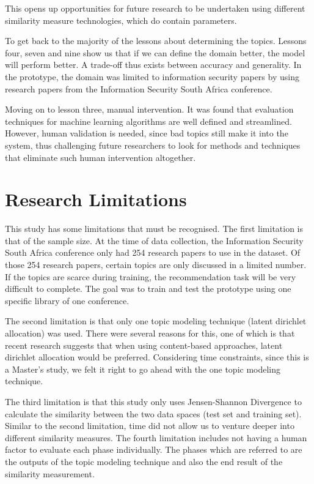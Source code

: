 This opens up opportunities for future research to be undertaken using different similarity measure technologies, which do contain parameters. 

To get back to the majority of the lessons about determining the topics. Lessons four, seven and nine show us that if we can define the domain better, the model will perform better. A trade-off thus exists between accuracy and generality. In the prototype, the domain was limited to information security papers by using research papers from the Information Security South Africa conference. 

Moving on to lesson three, manual intervention. It was found that evaluation techniques for machine learning algorithms are well defined and streamlined. However, human validation is needed, since bad topics still make it into the system, thus challenging future researchers to look for methods and techniques that eliminate such human intervention altogether.

\section{Research Limitations}

This study has some limitations that must be recognised. The first limitation is that of the sample size. At the time of data collection, the Information Security South Africa conference only had 254 research papers to use in the dataset. Of those 254 research papers, certain topics are only discussed in a limited number. If the topics are scarce during training, the recommendation task will be very difficult to complete. The goal was to train and test the prototype using one specific library of one conference.

The second limitation is that only one topic modeling technique (latent dirichlet allocation) was used. There were several reasons for this, one of which is that recent research suggests that when using content-based approaches, latent dirichlet allocation would be preferred. Considering time constraints, since this is a Master’s study, we felt it right to go ahead with the one topic modeling technique.

The third limitation is that this study only uses Jensen-Shannon Divergence to calculate the similarity between the two data spaces (test set and training set). Similar to the second limitation, time did not allow us to venture deeper into different similarity measures.
The fourth limitation includes not having a human factor to evaluate each phase individually. The phases which are referred to are the outputs of the topic modeling technique and also the end result of the similarity measurement.

